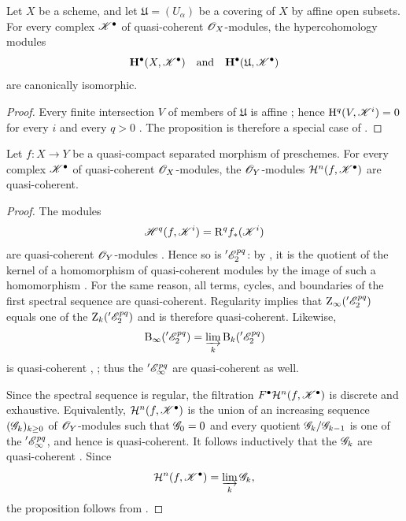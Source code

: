 \begin{proposition}[6.2.2]
\label{III.6.2.2}
Let $X$ be a scheme, and let $\mathfrak{U}=(U_\alpha)$ be a
covering of $X$ by affine open subsets.  For every complex
$\mathscr{K}^\bullet$ of quasi-coherent $\mathscr{O}_X$-modules, the
hypercohomology modules
\[
  \mathbf{H}^\bullet(X,\mathscr{K}^\bullet)
  \quad\text{and}\quad
  \mathbf{H}^\bullet(\mathfrak{U},\mathscr{K}^\bullet)
\]
are canonically isomorphic.
\end{proposition}

\begin{proof}
Every finite intersection $V$ of members of $\mathfrak{U}$ is
affine ; hence
$\mathrm H^q(V,\mathscr{K}^i)=0$ for every $i$ and every $q>0$
.  The proposition is therefore a special case of
.
\end{proof}

\begin{proposition}[6.2.3]
\label{III.6.2.3}
Let $f:X\to Y$ be a quasi-compact separated morphism of
preschemes.  For every complex $\mathscr{K}^\bullet$ of quasi-coherent
$\mathscr{O}_X$-modules, the $\mathscr{O}_Y$-modules
$\mathcal{H}^n(f,\mathscr{K}^\bullet)$ are quasi-coherent.
\end{proposition}

\begin{proof}
The modules
\[
  \mathscr{H}^q(f,\mathscr{K}^i)=\mathrm R^qf_*(\mathscr{K}^i)
\]
are quasi-coherent $\mathscr{O}_Y$-modules .  Hence so
is $'\mathscr{E}_2^{pq}$: by , it is the quotient of
the kernel of a homomorphism of quasi-coherent modules by the image
of such a homomorphism .  For the same reason, all
terms, cycles, and boundaries of the first spectral sequence are
quasi-coherent.  Regularity implies that
$\mathrm{Z}_\infty('\mathscr{E}_2^{pq})$ equals one of the
$\mathrm{Z}_k('\mathscr{E}_2^{pq})$ and is therefore quasi-coherent.
Likewise,
\[
  \mathrm{B}_\infty('\mathscr{E}_2^{pq})
  =
  \varinjlim_k\mathrm{B}_k('\mathscr{E}_2^{pq})
\]
is quasi-coherent , ; thus the
$'\mathscr{E}_\infty^{pq}$ are quasi-coherent as well.

Since the spectral sequence is regular, the filtration
$F^\bullet\mathcal{H}^n(f,\mathscr{K}^\bullet)$ is discrete and
exhaustive.  Equivalently,
$\mathcal{H}^n(f,\mathscr{K}^\bullet)$ is the union of an increasing
sequence $(\mathscr{G}_k)_{k\geq0}$ of $\mathscr{O}_Y$-modules such that
$\mathscr{G}_0=0$ and every quotient
$\mathscr{G}_k/\mathscr{G}_{k-1}$ is one of the
$'\mathscr{E}_\infty^{pq}$, and hence is quasi-coherent.  It follows
inductively that the $\mathscr{G}_k$ are quasi-coherent
.  Since
\[
  \mathcal{H}^n(f,\mathscr{K}^\bullet)
  =
  \varinjlim_k\mathscr{G}_k,
\]
the proposition follows from .
\end{proof}


